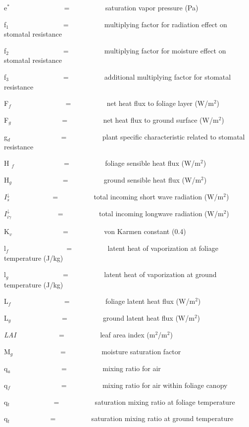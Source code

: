 e\(^{*}\)~~~~~~~~~~~~~~~ = ~~~~~~~~~ saturation vapor pressure (Pa)

f\(_{1}\)~~~~~~~~~~~~~~~ = ~~~~~~~~~ multiplying factor for radiation effect on stomatal resistance

f\(_{2}\)~~~~~~~~~~~~~~~ = ~~~~~~~~~ multiplying factor for moisture effect on stomatal resistance

f\(_{3}\)~~~~~~~~~~~~~~~ = ~~~~~~~~~ additional multiplying factor for stomatal resistance

F\(_{f}\)~~~~~~~~~~~~~~~ = ~~~~~~~~~ net heat flux to foliage layer (W/m\(^{2}\))

F\(_{g}\)~~~~~~~~~~~~~~ = ~~~~~~~~~ net heat flux to ground surface (W/m\(^{2}\))

g\(_{d}\)~~~~~~~~~~~~~~ = ~~~~~~~~~ plant specific characteristic related to stomatal resistance

H \emph{\(_{f}\)} ~~~~~~~~~~~~~ = ~~~~~~~~~ foliage sensible heat flux (W/m\(^{2}\))

H\(_{g}\)~~~~~~~~~~~~~~ = ~~~~~~~~~ ground sensible heat flux (W/m\(^{2}\))

\(I_s^ \downarrow\) ~~~~~~~~~~~ = ~~~~~~~~~ total incoming short wave radiation (W/m\(^{2}\))

\(I_{i\gamma }^ \downarrow\) ~~~~~~~~~~~~ = ~~~~~~~~~ total incoming longwave radiation (W/m\(^{2}\))

K\(_{v}\)~~~~~~~~~~~~~~ = ~~~~~~~~~ von Karmen constant (0.4)

l\(_{f}\)~~~~~~~~~~~~~~~~ = ~~~~~~~~~ latent heat of vaporization at foliage temperature (J/kg)

l\(_{g}\)~~~~~~~~~~~~~~~ = ~~~~~~~~~ latent heat of vaporization at ground temperature (J/kg)

L\emph{\(_{f}\)}~ ~~~~~~~~~~~~~ = ~~~~~~~~~ foliage latent heat flux (W/m\(^{2}\))

L\(_{g}\)~~~~~~~~~~~~~~ = ~~~~~~~~~ ground latent heat flux (W/m\(^{2}\))

\emph{LAI}~ ~~~~~~~~~~ = ~~~~~~~~~ leaf area index (m\(^{2}\)/m\(^{2}\))

M\(_{g}\)~~~~~~~~~~~~~ = ~~~~~~~~~ moisture saturation factor

q\(_{a}\)~~~~~~~~~~~~~~ = ~~~~~~~~~ mixing ratio for air

q\(_{f}\)~~~~~~~~~~~~~~ = ~~~~~~~~~ mixing ratio for air within foliage canopy

q\(_{t}\)~~~~~~~~~~~~ = ~~~~~~~~~ saturation mixing ratio at foliage temperature

q\(_{t}\)~~~~~~~~~~~ = ~~~~~~~~~ saturation mixing ratio at ground temperature

